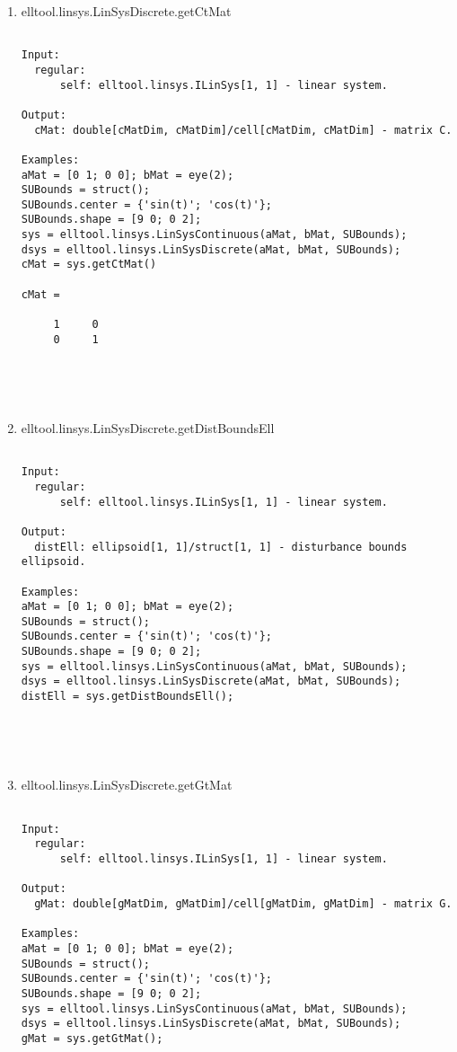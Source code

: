 \begin{enumerate}
\begin{lstlisting}
\end{lstlisting}
\fontfamily{\familydefault}
\selectfont
\item {elltool.linsys.LinSysDiscrete.getCtMat}
\selectfont
\begin{lstlisting}

Input:
  regular:
      self: elltool.linsys.ILinSys[1, 1] - linear system.

Output:
  cMat: double[cMatDim, cMatDim]/cell[cMatDim, cMatDim] - matrix C.

Examples:
aMat = [0 1; 0 0]; bMat = eye(2);
SUBounds = struct();
SUBounds.center = {'sin(t)'; 'cos(t)'};
SUBounds.shape = [9 0; 0 2];
sys = elltool.linsys.LinSysContinuous(aMat, bMat, SUBounds);
dsys = elltool.linsys.LinSysDiscrete(aMat, bMat, SUBounds);
cMat = sys.getCtMat()

cMat =

     1     0
     0     1





\end{lstlisting}
\fontfamily{\familydefault}
\selectfont
\item {elltool.linsys.LinSysDiscrete.getDistBoundsEll}
\selectfont
\begin{lstlisting}

Input:
  regular:
      self: elltool.linsys.ILinSys[1, 1] - linear system.

Output:
  distEll: ellipsoid[1, 1]/struct[1, 1] - disturbance bounds ellipsoid.

Examples:
aMat = [0 1; 0 0]; bMat = eye(2);
SUBounds = struct();
SUBounds.center = {'sin(t)'; 'cos(t)'};
SUBounds.shape = [9 0; 0 2];
sys = elltool.linsys.LinSysContinuous(aMat, bMat, SUBounds);
dsys = elltool.linsys.LinSysDiscrete(aMat, bMat, SUBounds);
distEll = sys.getDistBoundsEll();





\end{lstlisting}
\fontfamily{\familydefault}
\selectfont
\item {elltool.linsys.LinSysDiscrete.getGtMat}
\selectfont
\begin{lstlisting}

Input:
  regular:
      self: elltool.linsys.ILinSys[1, 1] - linear system.

Output:
  gMat: double[gMatDim, gMatDim]/cell[gMatDim, gMatDim] - matrix G.

Examples:
aMat = [0 1; 0 0]; bMat = eye(2);
SUBounds = struct();
SUBounds.center = {'sin(t)'; 'cos(t)'};
SUBounds.shape = [9 0; 0 2];
sys = elltool.linsys.LinSysContinuous(aMat, bMat, SUBounds);
dsys = elltool.linsys.LinSysDiscrete(aMat, bMat, SUBounds);
gMat = sys.getGtMat();






\end{lstlisting}
\end{enumerate}

